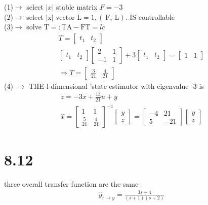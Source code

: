 \documentclass{article}
\begin{document}
(1)$\rightarrow$ select $|x|$ stable matrix $F=-3$\\
(2)$\rightarrow$ select $|\mathrm{x}|$ vector $\mathrm{L}=1,(\mathrm{~F}, \mathrm{~L})$. IS controllable\\
(3)$\rightarrow$ solve $\mathrm{T}=: \mathrm{TA}-\mathrm{FT}=l c$\\
$$
\begin{array}{l}
T=\left[\begin{array}{ll}
t_{1} & t_{2}
\end{array}\right] \\
\left[\begin{array}{ll}
t_{1} & t_{2}
\end{array}\right]\left[\begin{array}{cc}
2 & 1 \\
-1 & 1
\end{array}\right]+3\left[\begin{array}{ll}
t_{1} & t_{2}
\end{array}\right]=\left[\begin{array}{ll}
1 & 1
\end{array}\right] \\
\Rightarrow T=\left[\begin{array}{cc}
\frac{3}{21} & \frac{4}{21}
\end{array}\right]
\end{array}
$$
(4) $\rightarrow$ THE l-dimensional 'state estimutor with eigenvalue -3 is
$$
\begin{array}{l}
\dot{z}=-3 x+\frac{13}{21} u+y \\
\hat{x}=\left[\begin{array}{cc}
1 & 1 \\
\frac{5}{21} & \frac{4}{21}
\end{array}\right]^{-1}\left[\begin{array}{l}
y \\
z
\end{array}\right]=\left[\begin{array}{cc}
-4 & 21 \\
5 & -21
\end{array}\right]\left[\begin{array}{l}
y \\
z
\end{array}\right]
\end{array}
$$

\section*{8.12}
three overall transfer function are the same
$$
\begin{aligned}
\hat{y}_{r \rightarrow y}=\frac{3 s-4}{(s+1)(s+2)}
\end{aligned}
$$
\end{document}
